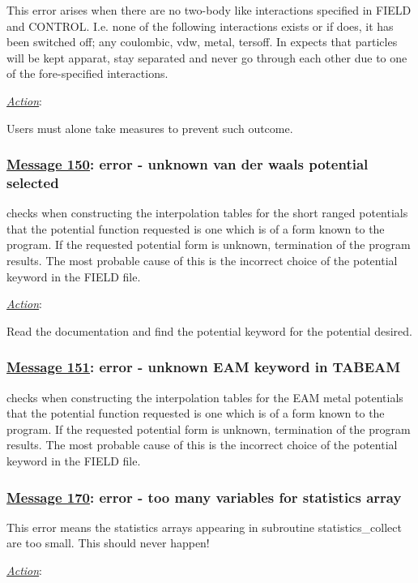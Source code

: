 This error arises when there are no two-body like interactions
specified in FIELD and CONTROL.  I.e. none of the following
interactions exists or if does, it has been switched off;
any coulombic, vdw, metal, tersoff.  In \D expects that particles will
be kept apparat, stay separated and never go through each other
due to one of the fore-specified interactions.

\noindent \underline{\em Action}:

Users must alone take measures to prevent such outcome.

\subsubsection*{\underline{Message 150}: error - unknown van der waals potential selected}

\D checks when constructing the interpolation tables for the short
ranged potentials that the potential function requested is one
which is of a form known to the program.  If the requested
potential form is unknown, termination of the program results. The
most probable cause of this is the incorrect choice of the
potential keyword in the FIELD file.

\noindent \underline{\em Action}:

Read the \D documentation and find the potential keyword for the
potential desired.

\subsubsection*{\underline{Message 151}: error - unknown EAM keyword in TABEAM}

\D checks when constructing the interpolation tables for the EAM metal
potentials that the potential function requested is one which is
of a form known to the program.  If the requested potential form
is unknown, termination of the program results. The most probable
cause of this is the incorrect choice of the potential keyword in
the FIELD file.

\subsubsection*{\underline{Message 170}: error - too many variables for statistics array }

This error means the statistics arrays appearing in subroutine
{\sc statistics\_collect} are too small.  This should never
happen!

\noindent \underline{\em Action}:

